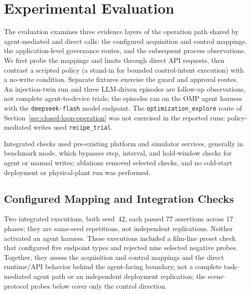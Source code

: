 \section{Experimental Evaluation}
\label{sec:eval}
The evaluation examines three evidence layers of the operation path shared by agent-mediated and direct calls: the configured acquisition and control mappings, the application-level governance routes, and the subsequent process observations. We first probe the mappings and limits through direct API requests, then contrast a scripted policy (a stand-in for bounded control-intent execution) with a no-write condition. Separate fixtures exercise the guard and approval routes. An injection-twin run and three LLM-driven episodes are follow-up observations, not complete agent-to-device trials; the episodes ran on the OMP agent harness with the \texttt{deepseek-flash} model endpoint. The \texttt{optimization\_explore} route of Section~\ref{sec:closed-loop-operation} was not exercised in the reported runs; policy-mediated writes used \texttt{recipe\_trial}.

Integrated checks used pre-existing platform and simulator services, generally in benchmark mode, which bypasses step, interval, and hold-window checks for agent or manual writes; ablations removed selected checks, and no cold-start deployment or physical-plant run was performed.

\subsection{Configured Mapping and Integration Checks}
\label{sec:eval-mapping}
Two integrated executions, both seed~42, each passed 77 assertions across 17 phases; they are same-seed repetitions, not independent replications. Neither activated an agent harness. These executions included a film-line preset check that configured five endpoint types and rejected nine selected negative probes. Together, they assess the acquisition and control mappings and the direct runtime/API behavior behind the agent-facing boundary, not a complete task-mediated agent path or an independent deployment replication; the scene--protocol probes below cover only the control direction.

